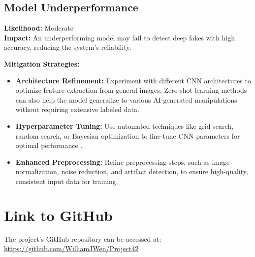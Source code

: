 \documentclass{article} %
\begin{document}
\subsection{Model Underperformance}
\textbf{Likelihood:} Moderate \\
\textbf{Impact:} An underperforming model may fail to detect deep fakes with high accuracy, reducing the system’s reliability.

\textbf{Mitigation Strategies:}
\begin{itemize}
    \item \textbf{Architecture Refinement:} Experiment with different CNN architectures to optimize feature extraction from general images. Zero-shot learning methods can also help the model generalize to various AI-generated manipulations without requiring extensive labeled data.
    \item \textbf{Hyperparameter Tuning:} Use automated techniques like grid search, random search, or Bayesian optimization to fine-tune CNN parameters for optimal performance \cite{bergstra2011}.
    \item \textbf{Enhanced Preprocessing:} Refine preprocessing steps, such as image normalization, noise reduction, and artifact detection, to ensure high-quality, consistent input data for training.
\end{itemize}

\section{Link to GitHub}
The project's GitHub repository can be accessed at:  
\href{https://github.com/WilliamJWen/Project42}{https://github.com/WilliamJWen/Project42}


\label{last_page}



\end{document}
